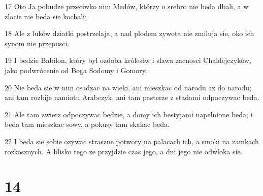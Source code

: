 \par 17 Oto Ja pobudze przeciwko nim Medów, którzy o srebro nie beda dbali, a w zlocie nie beda sie kochali;
\par 18 Ale z luków dziatki postrzelaja, a nad plodem zywota nie zmiluja sie, oko ich synom nie przepusci.
\par 19 I bedzie Babilon, który byl ozdoba królestw i slawa zacnosci Chaldejczyków, jako podwrócenie od Boga Sodomy i Gomory.
\par 20 Nie beda sie w nim osadzac na wieki, ani mieszkac od narodu az do narodu; ani tam rozbije namiotu Arabczyk, ani tam pasterze z stadami odpoczywac beda.
\par 21 Ale tam zwierz odpoczywac bedzie, a domy ich bestyjami napelnione beda; i beda tam mieszkac sowy, a pokusy tam skakac beda.
\par 22 I beda sie sobie ozywac straszne potwory na palacach ich, a smoki na zamkach rozkosznych. A blisko tego ze przyjdzie czas jego, a dni jego nie odwloka sie.

\chapter{14}

